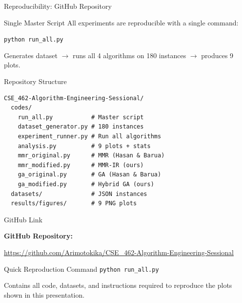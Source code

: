 \documentclass[aspectratio=169,10pt]{beamer}
\begin{document}
\begin{frame}[fragile]{Reproducibility: GitHub Repository}
  \begin{block}{Single Master Script}
    All experiments are reproducible with a single command:
    \begin{center}
      \texttt{python run\_all.py}
    \end{center}
    Generates dataset $\rightarrow$ runs all 4 algorithms on 180 instances $\rightarrow$ produces 9 plots.
  \end{block}

  \vspace{0.1cm}

  \begin{exampleblock}{Repository Structure}
\scriptsize
\begin{verbatim}
CSE_462-Algorithm-Engineering-Sessional/
  codes/
    run_all.py           # Master script
    dataset_generator.py # 180 instances
    experiment_runner.py # Run all algorithms
    analysis.py          # 9 plots + stats
    mmr_original.py      # MMR (Hasan & Barua)
    mmr_modified.py      # MMR-IR (ours)
    ga_original.py       # GA (Hasan & Barua)
    ga_modified.py       # Hybrid GA (ours)
  datasets/              # JSON instances
  results/figures/       # 9 PNG plots
\end{verbatim}
  \end{exampleblock}
\end{frame}

\begin{frame}{GitHub Link}
  \begin{center}
    \vspace{0.8cm}
    {\Large\textbf{GitHub Repository:}}

    \vspace{0.4cm}
    {\large\url{https://github.com/Arimotokika/CSE_462-Algorithm-Engineering-Sessional}}

    \vspace{0.8cm}
    \begin{block}{Quick Reproduction Command}
      \small
      \texttt{python run\_all.py}
    \end{block}

    \vspace{0.25cm}
    {\scriptsize Contains all code, datasets, and instructions required to reproduce the plots shown in this presentation.}
  \end{center}
\end{frame}
\end{document}
